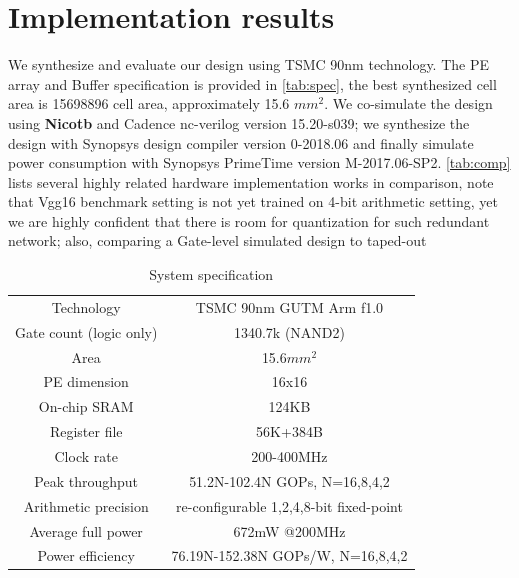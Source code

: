 \section{Implementation results}
We synthesize and evaluate our design using TSMC 90nm technology. The PE array and Buffer specification is provided in \autoref{tab:spec}, the best synthesized cell area is 15698896 cell area, approximately 15.6 $mm^2$. We co-simulate the design using \textbf{Nicotb}\cite{nicotb} and Cadence nc-verilog version 15.20-s039; we synthesize the design with Synopsys design compiler version 0-2018.06 and finally simulate power consumption with Synopsys PrimeTime version M-2017.06-SP2. \autoref{tab:comp} lists several highly related hardware implementation works in comparison, note that Vgg16 benchmark setting is not yet trained on 4-bit arithmetic setting, yet we are highly confident that there is room for quantization for such redundant network; also, comparing a Gate-level simulated design to taped-out \\
\begin{table}[h]
    \caption{System specification}
    \label{tab:spec}
    \centering
    \footnotesize 
        \begin{tabular}{c|c}
        \toprule
        \midrule
        Technology & TSMC 90nm GUTM Arm f1.0\\
        Gate count (logic only) & 1340.7k (NAND2)\\
        Area & 15.6$mm^2$\\
        PE dimension & 16x16\\
        On-chip SRAM & 124KB\\
        Register file & 56K+384B\\
        Clock rate & 200-400MHz\\
        Peak throughput & 51.2N-102.4N GOPs, N=16,8,4,2\\
        Arithmetic precision & re-configurable 1,2,4,8-bit fixed-point\\
        Average full power & 672mW @200MHz\\
        Power efficiency & 76.19N-152.38N GOPs/W, N=16,8,4,2\\
        \bottomrule
        \end{tabular}
\end{table}
